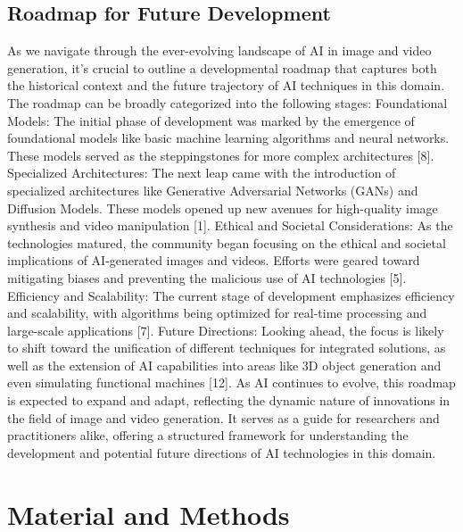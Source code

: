\documentclass[11pt,a4paper,oneside]{report}
\begin{document}
{\section{Roadmap for Future Development}
As we navigate through the ever-evolving landscape of AI in image and video generation, it's crucial to outline a developmental roadmap that captures both the historical context and the future trajectory of AI techniques in this domain. The roadmap can be broadly categorized into the following stages: Foundational Models: The initial phase of development was marked by the emergence of foundational models like basic machine learning algorithms and neural networks. These models served as the steppingstones for more complex architectures [8]. 
Specialized Architectures: The next leap came with the introduction of specialized architectures like Generative Adversarial Networks (GANs) and Diffusion Models. These models opened up new avenues for high-quality image synthesis and video manipulation [1]. 
Ethical and Societal Considerations: As the technologies matured, the community began focusing on the ethical and societal implications of AI-generated images and videos. Efforts were geared toward mitigating biases and preventing the malicious use of AI technologies [5]. 
Efficiency and Scalability: The current stage of development emphasizes efficiency and scalability, with algorithms being optimized for real-time processing and large-scale applications [7]. 
Future Directions: Looking ahead, the focus is likely to shift toward the unification of different techniques for integrated solutions, as well as the extension of AI capabilities into areas like 3D object generation and even simulating functional machines [12]. 
As AI continues to evolve, this roadmap is expected to expand and adapt, reflecting the dynamic nature of innovations in the field of image and video generation. It serves as a guide for researchers and practitioners alike, offering a structured framework for understanding the development and potential future directions of AI technologies in this domain. 

}


\chapter{Material and Methods}
\label{material-and-methods}
\end{document}
